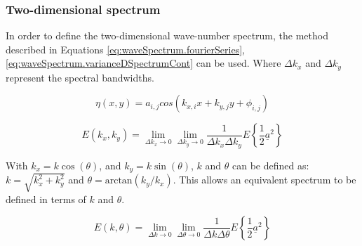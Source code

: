 


\subsubsection{Two-dimensional spectrum} \label{subsec:theory.waves.waveNumberSpectra.2D}
In order to define the two-dimensional wave-number spectrum, the method described in Equations \ref{eq:waveSpectrum.fourierSeries}, \ref{eq:waveSpectrum.varianceDSpectrumCont} can be used. Where $\Delta k_{x}$ and $\Delta k_{y}$ represent the spectral bandwidths.

\begin{equation} \label{eq:waveNumberSpectrum.fourierSeries_2D}
    \eta(x,y) = a_{i,j}cos(k_{x,i}x + k_{y,j}y + \phi_{i,j})
\end{equation}

\begin{equation} \label{eq:waveNumberSpectrum.SpectrumCont_2D}
    E(k_{x},k_{y}) = \lim_{\Delta k_{x} \to 0} \lim_{\Delta k_{y} \to 0} \frac{1}{\Delta k_{x} \Delta k_{y}} E\left \{ \frac{1}{2} \underline{a}^{2}\right \}
\end{equation}

With $k_{x} = k\cos(\theta)$, and $k_{y} = k\sin(\theta)$, $k$ and $\theta$ can be defined as: $k = \sqrt{k_{x}^2 + k_{y}^2}$ and $\theta = \text{arctan}(k_{y}/k_{x})$. This allows an equivalent spectrum to be defined in terms of $k$ and $\theta$.

\begin{equation} \label{eq:waveNumberSpectrum.SpectrumCont_2D_kTh}
    E(k,\theta) = \lim_{\Delta k \to 0} \lim_{\Delta \theta \to 0} \frac{1}{\Delta k \Delta \theta} E\left \{ \frac{1}{2} \underline{a}^{2}\right \}
\end{equation}

